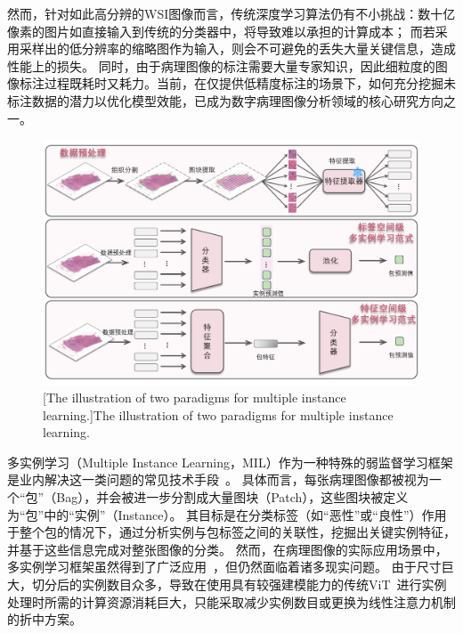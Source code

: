 然而，针对如此高分辨的WSI图像而言，传统深度学习算法仍有不小挑战：数十亿像素的图片如直接输入到传统的分类器中，将导致难以承担的计算成本；
而若采用采样出的低分辨率的缩略图作为输入，则会不可避免的丢失大量关键信息，造成性能上的损失。
同时，由于病理图像的标注需要大量专家知识，因此细粒度的图像标注过程既耗时又耗力。当前，在仅提供低精度标注的场景下，如何充分挖掘未标注数据的潜力以优化模型效能，已成为数字病理图像分析领域的核心研究方向之一。
\begin{figure}[h]
    \centering
    \includegraphics[width=\columnwidth]{figures/多实例学习范式.pdf}
    [The illustration of two paradigms for multiple instance learning.]{The illustration of two paradigms for multiple instance learning.}
    \label{figure1: 多实例学习范式}
\end{figure}

多实例学习（Multiple Instance Learning，MIL）\cite{dietterich1997solving,herrera2016multiple}作为一种特殊的弱监督学习框架是业内解决这一类问题的常见技术手段~。
具体而言，每张病理图像都被视为一个“包”（Bag），并会被进一步分割成大量图块（Patch），这些图块被定义为“包”中的“实例”（Instance）。
其目标是在分类标签（如“恶性”或“良性”）作用于整个包的情况下，通过分析实例与包标签之间的关联性，挖掘出关键实例特征，并基于这些信息完成对整张图像的分类。
然而，在病理图像的实际应用场景中，多实例学习框架虽然得到了广泛应用~\cite{li2021dual,lu2021data,shao2021transmil,zhang2022dtfd,tang2024feature}，但仍然面临着诸多现实问题。
由于尺寸巨大，切分后的实例数目众多，导致在使用具有较强建模能力的传统ViT~\cite{dosovitskiy2020image}进行实例处理时所需的计算资源消耗巨大，只能采取减少实例数目或更换为线性注意力机制的折中方案。

